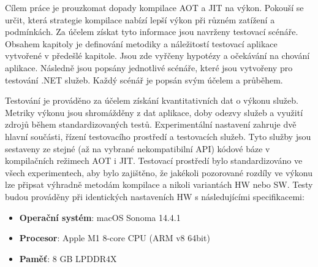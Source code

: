 


Cílem práce je prouzkomat dopady kompilace AOT a JIT na výkon. Pokouší se určit, která strategie kompilace nabízí lepší výkon při různém zatížení a podmínkách. Za účelem získat tyto informace jsou navrženy testovací scénáře. Obsahem kapitoly je definování metodiky a náležitostí testovací aplikace vytvořené v předešlé kapitole. Jsou zde vyřčeny hypotézy a očekávání na chování aplikace. Následně jsou popsány jednotlivé scénáře, které jsou vytvořeny pro testování .NET služeb. Každý scénář je popsán svým účelem a průběhem.


Testování je prováděno za účelem získání kvantitativních dat o výkonu služeb. Metriky výkonu jsou shromážděny z dat aplikace, doby odezvy služeb a využití zdrojů během standardizovaných testů. Experimentální nastavení zahruje dvě hlavní součásti, řízení testovacího prostředí a testovacích služeb. Tyto služby jsou sestaveny ze stejné (až na vybrané nekompatibilní API) kódové báze v kompilačních režimech AOT i JIT. Testovací prostředí bylo standardizováno ve všech experimentech, aby bylo zajištěno, že jakékoli pozorované rozdíly ve výkonu lze připsat výhradně metodám kompilace a nikoli variantách HW nebo SW. Testy budou prováděny při identických nastaveních HW s následujícími specifikacemi:

\begin{itemize}
    \item \textbf{Operační systém}: macOS Sonoma 14.4.1
    \item \textbf{Procesor}: Apple M1 8-core CPU (ARM v8 64bit)
    \item \textbf{Paměť}: 8 GB LPDDR4X
\end{itemize}

